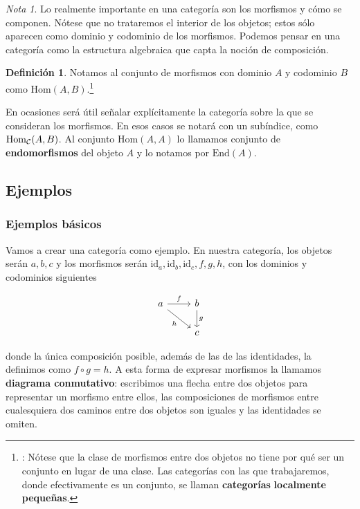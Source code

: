 \documentclass[11pt]{article}
\theoremstyle{plain}
\theoremstyle{definition}
\newtheorem{definition}{Definición}
\theoremstyle{remark}
\newtheorem*{remark}{Nota}
\begin{document}
\begin{remark}
Lo realmente importante en una categoría son los morfismos y cómo se
componen. Nótese que no trataremos el interior de los objetos; estos
sólo aparecen como dominio y codominio de los morfismos. Podemos
pensar en una categoría como la estructura algebraica que capta la
noción de composición.
\end{remark}

\begin{definition}
Notamos al conjunto de morfismos con dominio \(A\) y codominio \(B\) 
como \(\mathrm{Hom}(A,B)\).\footnote{: Nótese que la clase de morfismos entre dos objetos no
tiene por qué ser un conjunto en lugar de una clase. Las categorías con las
que trabajaremos, donde efectivamente es un conjunto, se llaman \textbf{categorías}
\textbf{localmente pequeñas}.}
\end{definition}

En ocasiones será útil señalar explícitamente la categoría sobre la que
se consideran los morfismos. En esos casos se notará con un subíndice,
como \(\mathrm{Hom}_{\cal C}(A,B)\). Al conjunto \(\mathrm{Hom}(A,A)\) lo llamamos conjunto de
\textbf{endomorfismos} del objeto \(A\) y lo notamos por \(\mathrm{End}(A)\).

\subsection{Ejemplos}
\label{sec:orga05288b}
\subsubsection{Ejemplos básicos}
\label{sec:orgba91929}
Vamos a crear una categoría como ejemplo. En nuestra categoría, los
objetos serán \(a,b,c\) y los morfismos serán \(\mathrm{id}_a,\mathrm{id}_b,\mathrm{id}_c,f,g,h\), con los 
dominios y codominios siguientes

\[\begin{tikzcd}
a  \ar{dr}[swap]{h} \rar{f} & 
b  \dar{g} \\
& c
\end{tikzcd}\]

donde la única composición posible, además de las de las identidades,
la definimos como \(f \circ g = h\). A esta forma de expresar morfismos la
llamamos \textbf{diagrama conmutativo}: escribimos una flecha entre dos
objetos para representar un morfismo entre ellos, las composiciones de
morfismos entre cualesquiera dos caminos entre dos objetos son iguales
y las identidades se omiten.
\end{document}
